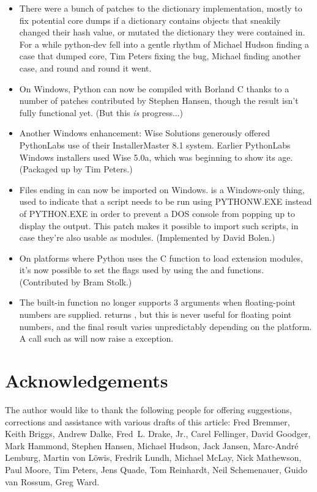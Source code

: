 \documentclass{howto}
\begin{document}
\begin{itemize}
  \item There were a bunch of patches to the dictionary
  implementation, mostly to fix potential core dumps if a dictionary
  contains objects that sneakily changed their hash value, or mutated
  the dictionary they were contained in. For a while python-dev fell
  into a gentle rhythm of Michael Hudson finding a case that dumped
  core, Tim Peters fixing the bug, Michael finding another case, and round
  and round it went.   

  \item On Windows, Python can now be compiled with Borland C thanks
  to a number of patches contributed by Stephen Hansen, though the
  result isn't fully functional yet.  (But this \emph{is} progress...)
  
  \item Another Windows enhancement: Wise Solutions generously offered
  PythonLabs use of their InstallerMaster 8.1 system.  Earlier
  PythonLabs Windows installers used Wise 5.0a, which was beginning to
  show its age.  (Packaged up by Tim Peters.)

  \item Files ending in  can now be imported on Windows.
   is a Windows-only thing, used to indicate that a script
  needs to be run using PYTHONW.EXE instead of PYTHON.EXE in order to
  prevent a DOS console from popping up to display the output.  This
  patch makes it possible to import such scripts, in case they're also
  usable as modules.  (Implemented by David Bolen.)

  \item On platforms where Python uses the C  function 
  to load extension modules, it's now possible to set the flags used 
  by  using the  and
   functions.    (Contributed by Bram Stolk.)

  \item The  built-in function no longer supports 3
  arguments when floating-point numbers are supplied.
   returns , but
  this is never useful for floating point numbers, and the final
  result varies unpredictably depending on the platform.  A call such
  as  will now raise a 
  exception.
  
\end{itemize}


\section{Acknowledgements}

The author would like to thank the following people for offering
suggestions, corrections and assistance with various drafts of this
article: Fred Bremmer, Keith Briggs, Andrew Dalke, Fred~L. Drake, Jr.,
Carel Fellinger, David Goodger, Mark Hammond, Stephen Hansen, Michael Hudson, Jack
Jansen, Marc-Andr\'e Lemburg, Martin von L\"owis, Fredrik Lundh,
Michael McLay, Nick Mathewson, Paul Moore, Tim Peters, Jens Quade, Tom
Reinhardt, Neil Schemenauer, Guido van Rossum, Greg Ward.
\end{document}
